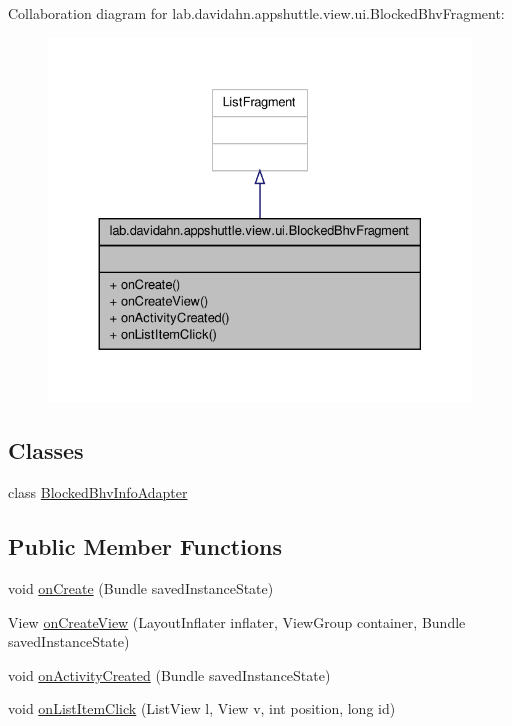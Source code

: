 \-Collaboration diagram for lab.\-davidahn.\-appshuttle.\-view.\-ui.\-Blocked\-Bhv\-Fragment\-:
\nopagebreak
\begin{figure}[H]
\begin{center}
\leavevmode
\includegraphics[width=330pt]{classlab_1_1davidahn_1_1appshuttle_1_1view_1_1ui_1_1_blocked_bhv_fragment__coll__graph}
\end{center}
\end{figure}
\subsection*{\-Classes}
\begin{DoxyCompactItemize}
\item 
class \hyperlink{classlab_1_1davidahn_1_1appshuttle_1_1view_1_1ui_1_1_blocked_bhv_fragment_1_1_blocked_bhv_info_adapter}{\-Blocked\-Bhv\-Info\-Adapter}
\end{DoxyCompactItemize}
\subsection*{\-Public \-Member \-Functions}
\begin{DoxyCompactItemize}
\item 
void \hyperlink{classlab_1_1davidahn_1_1appshuttle_1_1view_1_1ui_1_1_blocked_bhv_fragment_a8107febc85278840ee81e6e53267580b}{on\-Create} (\-Bundle saved\-Instance\-State)
\item 
\-View \hyperlink{classlab_1_1davidahn_1_1appshuttle_1_1view_1_1ui_1_1_blocked_bhv_fragment_aea9434ff28daa6b284c767f698646b15}{on\-Create\-View} (\-Layout\-Inflater inflater, \-View\-Group container, \-Bundle saved\-Instance\-State)
\item 
void \hyperlink{classlab_1_1davidahn_1_1appshuttle_1_1view_1_1ui_1_1_blocked_bhv_fragment_a90a03e1d38fbbc6fc6d388d391713953}{on\-Activity\-Created} (\-Bundle saved\-Instance\-State)
\item 
void \hyperlink{classlab_1_1davidahn_1_1appshuttle_1_1view_1_1ui_1_1_blocked_bhv_fragment_a1e667f2329fe439b56161a5e5dd0c562}{on\-List\-Item\-Click} (\-List\-View l, \-View v, int position, long id)
\end{DoxyCompactItemize}


